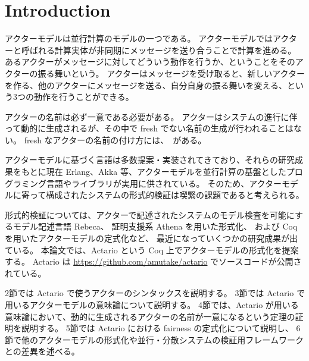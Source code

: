 \section{Introduction}
アクターモデルは並行計算のモデルの一つである。
アクターモデルではアクターと呼ばれる計算実体が非同期にメッセージを送り合うことで計算を進める。
あるアクターがメッセージに対してどういう動作を行うか、ということをそのアクターの振る舞いという。
アクターはメッセージを受け取ると、新しいアクターを作る、他のアクターにメッセージを送る、自分自身の振る舞いを変える、という3つの動作を行うことができる。

アクターの名前は必ず一意である必要がある。
アクターはシステムの進行に伴って動的に生成されるが、その中で fresh でない名前の生成が行われることはない。
fresh なアクターの名前の付け方には、~がある。

アクターモデルに基づく言語は多数提案・実装されてきており、それらの研究成果をもとに現在 Erlang、Akka 等、アクターモデルを並行計算の基盤としたプログラミング言語やライブラリが実用に供されている。
そのため、アクターモデルに寄って構成されたシステムの形式的検証は喫緊の課題であると考えられる。

形式的検証については、アクターで記述されたシステムのモデル検査を可能にするモデル記述言語 Rebeca、
証明支援系 Athena を用いた形式化、
および Coq を用いたアクターモデルの定式化など、
最近になっていくつかの研究成果が出ている。
本論文では、Actario という Coq 上でアクターモデルの形式化を提案する。
Actario は \url{https://github.com/amutake/actario} でソースコードが公開されている。

2節では Actario で使うアクターのシンタックスを説明する。
3節では Actario で用いるアクターモデルの意味論について説明する。
4節では、Actario が用いる意味論において、動的に生成されるアクターの名前が一意になるという定理の証明を説明する。
5節では Actario における fairness の定式化について説明し、
6節で他のアクターモデルの形式化や並行・分散システムの検証用フレームワークとの差異を述べる。
